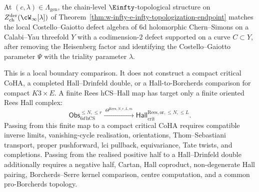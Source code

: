 \begin{proposition}
\label{prop:vol-ii-iii-coincidence}
At $(c, \lambda) \in \Lambda_{\mathrm{gen}}$, the chain-level
$\Einfty$-topological structure on
$Z^{\mathrm{der}}_{\mathrm{ch}}(\cW_\infty[\lambda])$ of
Theorem~\ref{thm:w-infty-e-infty-topologization-endpoint} matches the
local Costello--Gaiotto defect algebra of $6$d holomorphic
Chern--Simons on a Calabi--Yau threefold $Y$ with a codimension-$2$
defect supported on a curve $C \subset Y$, after removing the
Heisenberg factor and identifying the Costello--Gaiotto parameter
$\Psi$ with the triality parameter $\lambda$.

This is a local boundary comparison. It does not construct a compact
critical CoHA, a completed Hall--Drinfeld double, or a
Hall-to-Borcherds comparison for compact $K3\times E$. A finite Rees
hCS--Hall map has target only a finite oriented Rees Hall complex:
\[
 \mathsf{Obs}_{6d\,\mathrm{hCS}}^{\le N,\le r}
 \xrightarrow{\;\Theta^{\mathrm{Rees},N,r,L,m}\;}
 \mathsf{Hall}_{\mathrm{crit}}^{\mathrm{Rees},\mathrm{or},\le N,\le L}.
\]
Passing from this finite map to a compact critical CoHA requires
compatible inverse limits, vanishing-cycle realisation, orientations,
Thom--Sebastiani transport, proper pushforward, lci pullback,
equivariance, Tate twists, and completions. Passing from the realised
positive half to a Hall--Drinfeld double additionally requires a
negative half, Cartan, Hall coproduct, non-degenerate Hall pairing,
Borcherds--Serre kernel comparison, centre computation, and a common
pro-Borcherds topology.
\end{proposition}

